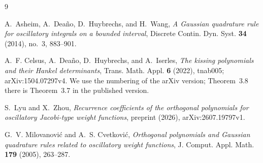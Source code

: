 \documentclass[11pt]{amsart}
\theoremstyle{remark}
\numberwithin{equation}{section}
\begin{document}
\begin{thebibliography}{9}

A.~Asheim, A.~Deaño, D.~Huybrechs, and H.~Wang, \emph{A Gaussian quadrature rule for oscillatory integrals on a bounded interval}, Discrete Contin. Dyn. Syst. \textbf{34} (2014), no.~3, 883--901.

A.~F. Celsus, A.~Deaño, D.~Huybrechs, and A.~Iserles, \emph{The kissing polynomials and their Hankel determinants}, Trans. Math. Appl. \textbf{6} (2022), tnab005; arXiv:1504.07297v4. We use the numbering of the arXiv version; Theorem~3.8 there is Theorem~3.7 in the published version.

S.~Lyu and X.~Zhou, \emph{Recurrence coefficients of the orthogonal polynomials for oscillatory Jacobi-type weight functions}, preprint (2026), arXiv:2607.19797v1.

G.~V. Milovanović and A.~S. Cvetković, \emph{Orthogonal polynomials and Gaussian quadrature rules related to oscillatory weight functions}, J. Comput. Appl. Math. \textbf{179} (2005), 263--287.

\end{thebibliography}
\end{document}
